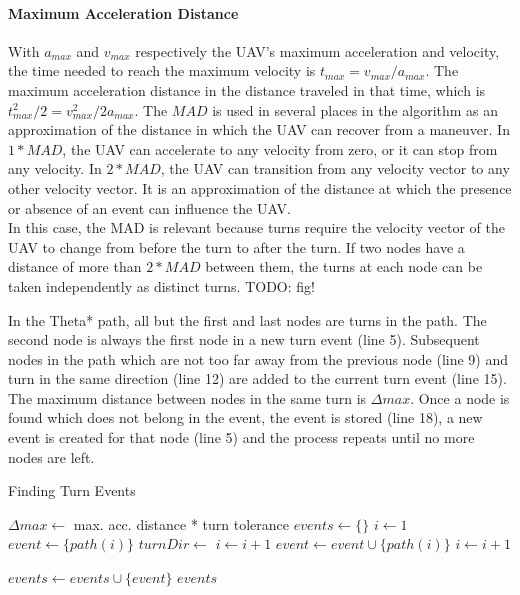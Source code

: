 \paragraph{Maximum Acceleration Distance}
With $a_{max}$ and $v_{max}$ respectively the UAV's maximum acceleration and velocity, the time needed to reach the maximum velocity is $t_{max} = v_{max} / a_{max}$. The maximum acceleration distance in the distance traveled in that time, which is $t_{max}^2 / 2 = v_{max}^2 / 2a_{max}$. The $MAD$ is used in several places in the algorithm as an approximation of the distance in which the UAV can recover from a maneuver. In $1*MAD$, the UAV can accelerate to any velocity from zero, or it can stop from any velocity. In $2*MAD$, the UAV can transition from any velocity vector to any other velocity vector. It is an approximation of the distance at which the presence or absence of an event can influence the UAV. \\
In this case, the MAD is relevant because turns require the velocity vector of the UAV to change from before the turn to after the turn. If two nodes have a distance of more than $2*MAD$ between them, the turns at each node can be taken independently as distinct turns. TODO: fig! \\
\par
In the Theta* path, all but the first and last nodes are turns in the path. The second node is always the first node in a new turn event (line 5). Subsequent nodes in the path which are not too far away from the previous node (line 9) and turn in the same direction (line 12) are added to the current turn event (line 15). The maximum distance between nodes in the same turn is $\Delta max$. Once a node is found which does not belong in the event, the event is stored (line 18), a new event is created for that node (line 5) and the process repeats until no more nodes are left.

\begin{algorithm}
\caption{Finding Turn Events}
\label{alg:corners}
\begin{algorithmic}[1]
  \State $\Delta max \leftarrow$ max. acc. distance * turn tolerance
  \State $events \leftarrow \{\}$ 
  \State $i \leftarrow 1$ 
   
  	\State $event \leftarrow \{ path(i) \}$ 
  	\State $turnDir \leftarrow$  
    	\State $i \leftarrow  i + 1$
    		\Break {}
	\EndIf
		\Break {}
	\EndIf
	\State $event \leftarrow event \cup \{ path(i) \}$
	\State $i \leftarrow  i + 1$
	
    	\EndWhile
    	
    	\State $events \leftarrow events \cup \{ event \}$
  \EndWhile
\Return $events$
\EndFunction
\end{algorithmic}
\end{algorithm}

